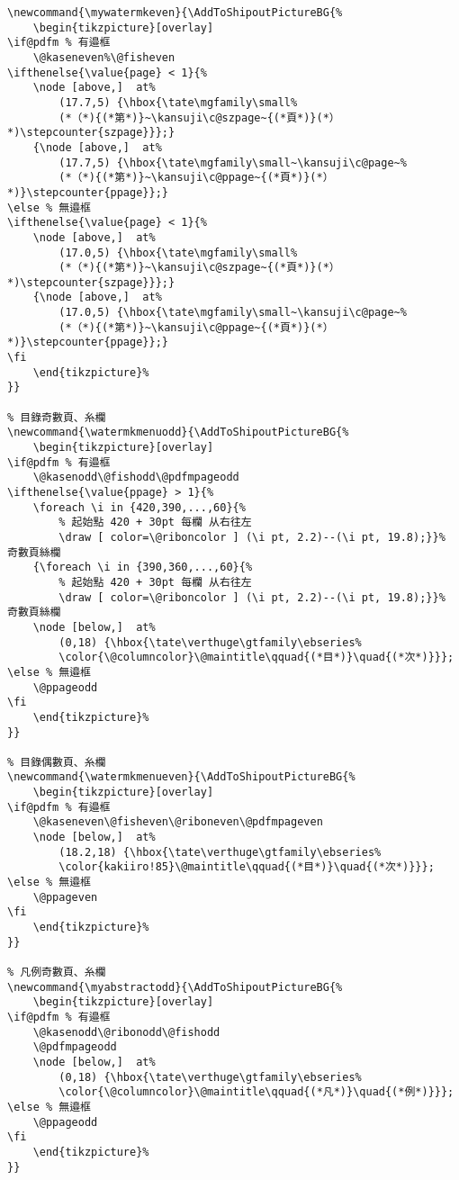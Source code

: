 \begin{lstlisting}[firstnumber=541]
% pagestyle my 偶數頁、無糸欄、垂直頁碼、無標題
\newcommand{\mywatermkeven}{\AddToShipoutPictureBG{%
	\begin{tikzpicture}[overlay]
\if@pdfm % 有邉框
	\@kaseneven%\@fisheven
\ifthenelse{\value{page} < 1}{%
	\node [above,]  at%
		(17.7,5) {\hbox{\tate\mgfamily\small%
		(*（*){(*第*)}~\kansuji\c@szpage~{(*頁*)}(*）*)\stepcounter{szpage}}};}
	{\node [above,]  at%
		(17.7,5) {\hbox{\tate\mgfamily\small~\kansuji\c@page~%
		(*（*){(*第*)}~\kansuji\c@ppage~{(*頁*)}(*）*)}\stepcounter{ppage}};}
\else % 無邉框
\ifthenelse{\value{page} < 1}{%
	\node [above,]  at%
		(17.0,5) {\hbox{\tate\mgfamily\small%
		(*（*){(*第*)}~\kansuji\c@szpage~{(*頁*)}(*）*)\stepcounter{szpage}}};}
	{\node [above,]  at%
		(17.0,5) {\hbox{\tate\mgfamily\small~\kansuji\c@page~%
		(*（*){(*第*)}~\kansuji\c@ppage~{(*頁*)}(*）*)}\stepcounter{ppage}};}
\fi
	\end{tikzpicture}%
}}

% 目錄奇數頁、糸欄
\newcommand{\watermkmenuodd}{\AddToShipoutPictureBG{%
	\begin{tikzpicture}[overlay]
\if@pdfm % 有邉框
	\@kasenodd\@fishodd\@pdfmpageodd
\ifthenelse{\value{ppage} > 1}{%
	\foreach \i in {420,390,...,60}{%
		% 起始點 420 + 30pt 每欄 从右往左
		\draw [ color=\@riboncolor ] (\i pt, 2.2)--(\i pt, 19.8);}}% 奇數頁絲欄 
	{\foreach \i in {390,360,...,60}{%
		% 起始點 420 + 30pt 每欄 从右往左
		\draw [ color=\@riboncolor ] (\i pt, 2.2)--(\i pt, 19.8);}}% 奇數頁絲欄 
	\node [below,]  at%
		(0,18) {\hbox{\tate\verthuge\gtfamily\ebseries%
		\color{\@columncolor}\@maintitle\qquad{(*目*)}\quad{(*次*)}}};
\else % 無邉框
	\@ppageodd
\fi
	\end{tikzpicture}%
}}

% 目錄偶數頁、糸欄
\newcommand{\watermkmenueven}{\AddToShipoutPictureBG{%
	\begin{tikzpicture}[overlay]
\if@pdfm % 有邉框
	\@kaseneven\@fisheven\@riboneven\@pdfmpageven
	\node [below,]  at%
		(18.2,18) {\hbox{\tate\verthuge\gtfamily\ebseries%
		\color{kakiiro!85}\@maintitle\qquad{(*目*)}\quad{(*次*)}}};
\else % 無邉框
	\@ppageven
\fi
	\end{tikzpicture}%
}}

% 凡例奇數頁、糸欄
\newcommand{\myabstractodd}{\AddToShipoutPictureBG{%
	\begin{tikzpicture}[overlay]
\if@pdfm % 有邉框
	\@kasenodd\@ribonodd\@fishodd
	\@pdfmpageodd
	\node [below,]  at%
		(0,18) {\hbox{\tate\verthuge\gtfamily\ebseries%
		\color{\@columncolor}\@maintitle\qquad{(*凡*)}\quad{(*例*)}}};
\else % 無邉框
	\@ppageodd
\fi
	\end{tikzpicture}%
}}


\end{lstlisting}
